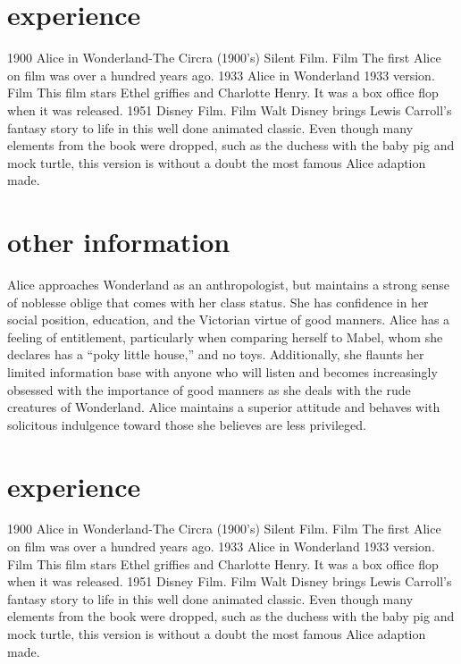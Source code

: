 \documentclass[]{mcec-cv}
\begin{document}
\section{experience}

\begin{twenty}
  \twentyitem
    {1900}
    {Alice in Wonderland-The Circra (1900's) Silent Film.}
    {Film}
    {The first Alice on film was over a hundred years ago.}
  \twentyitem
    {1933}
    {Alice in Wonderland 1933 version.}
    {Film}
    {This film stars Ethel griffies and Charlotte Henry. It was a box office flop when it was released.}
\twentyitem
    {1951}
    {Disney Film.}
    {Film}
    {Walt Disney brings Lewis Carroll's fantasy story to life in this well done animated classic. Even though many elements from the book were dropped, such as the duchess with the baby pig and mock turtle, this version is without a doubt the most famous Alice adaption made.}

\end{twenty}

\section{other information}
Alice approaches Wonderland as an anthropologist, but maintains a strong sense of noblesse oblige that comes with her class status. She has confidence in her social position, education, and the Victorian virtue of good manners. Alice has a feeling of entitlement, particularly when comparing herself to Mabel, whom she declares has a “poky little house,” and no toys. Additionally, she flaunts her limited information base with anyone who will listen and becomes increasingly obsessed with the importance of good manners as she deals with the rude creatures of Wonderland. Alice maintains a superior attitude and behaves with solicitous indulgence toward those she believes are less privileged.

\section{experience}

\begin{twenty}
  \twentyitem
    {1900}
    {Alice in Wonderland-The Circra (1900's) Silent Film.}
    {Film}
    {The first Alice on film was over a hundred years ago.}
  \twentyitem
    {1933}
    {Alice in Wonderland 1933 version.}
    {Film}
    {This film stars Ethel griffies and Charlotte Henry. It was a box office flop when it was released.}
\twentyitem
    {1951}
    {Disney Film.}
    {Film}
    {Walt Disney brings Lewis Carroll's fantasy story to life in this well done animated classic. Even though many elements from the book were dropped, such as the duchess with the baby pig and mock turtle, this version is without a doubt the most famous Alice adaption made.}

\end{twenty}
\end{document}
